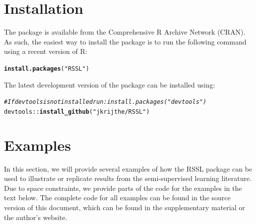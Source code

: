 \documentclass[runningheads,a4paper]{llncs}\usepackage[]{graphicx}\usepackage[]{color}
\makeatletter
\newcommand{\hlstr}[1]{\textcolor[rgb]{0.192,0.494,0.8}{#1}}%
\newcommand{\hlcom}[1]{\textcolor[rgb]{0.678,0.584,0.686}{\textit{#1}}}%
\newcommand{\hlopt}[1]{\textcolor[rgb]{0,0,0}{#1}}%
\newcommand{\hlstd}[1]{\textcolor[rgb]{0.345,0.345,0.345}{#1}}%
\newcommand{\hlkwd}[1]{\textcolor[rgb]{0.737,0.353,0.396}{\textbf{#1}}}%
\newenvironment{kframe}{%
 \def\at@end@of@kframe{}%
 \ifinner\ifhmode%
  \def\at@end@of@kframe{\end{minipage}}%
  \begin{minipage}{\columnwidth}%
 \fi\fi%
 \def\FrameCommand##1{\hskip\@totalleftmargin \hskip-\fboxsep
 \colorbox{shadecolor}{##1}\hskip-\fboxsep
     \hskip-\linewidth \hskip-\@totalleftmargin \hskip\columnwidth}%
 \MakeFramed {\advance\hsize-\width
   \@totalleftmargin\z@ \linewidth\hsize
   \@setminipage}}%
 {\par\unskip\endMakeFramed%
 \at@end@of@kframe}
\newenvironment{knitrout}{}{} %
\makeatother
\begin{document}
\section{Installation}
The package is available from the Comprehensive R Archive Network (CRAN). As such, the easiest way to install the package is to run the following command using a recent version of R:
\begin{knitrout}
\color{fgcolor}\begin{kframe}
\begin{alltt}
\hlkwd{install.packages}\hlstd{(}\hlstr{"RSSL"}\hlstd{)}
\end{alltt}
\end{kframe}
\end{knitrout}
\noindent The latest development version of the package can be installed using:
\begin{knitrout}
\color{fgcolor}\begin{kframe}
\begin{alltt}
\hlcom{# If devtools is not installed run: install.packages("devtools")}
\hlstd{devtools}\hlopt{::}\hlkwd{install_github}\hlstd{(}\hlstr{"jkrijthe/RSSL"}\hlstd{)}
\end{alltt}
\end{kframe}
\end{knitrout}

\section{Examples}
In this section, we will provide several examples of how the RSSL package can be used to illustrate or replicate results from the semi-supervised learning literature. Due to space constraints, we provide parts of the code for the examples in the text below. The complete code for all examples can be found in the source version of this document, which can be found in the supplementary material or the author's website.
\end{document}
